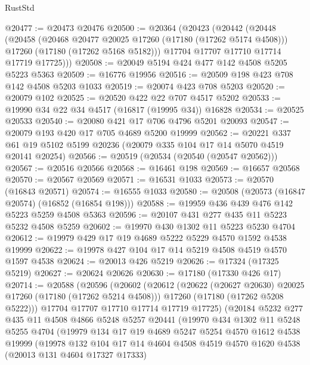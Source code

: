 \begin{lexlean}{RustStd}
\begin{coremodule}
@20477 := @20473 @20476
@20500 := @20364
    (@20423
      (@20442
        (@20448
          (@20458
            (@20468 @20477 @20025 @17260 (@17180 (@17262 @5174 @4508)))
            @17260
            (@17180 (@17262 @5168 @5182)))
          @17704
          @17707
          @17710
          @17714
          @17719
          @17725)))
@20508 := @20049 @5194 @424 @477 @142 @4508 @5205 @5223 @5363
@20509 := @16776 @19956
@20516 := @20509 @198 @423 @708 @142 @4508 @5203 @1033
@20519 := @20074 @423 @708 @5203
@20520 := @20079 @102
@20525 := @20520 @422 @22 @707 @4517 @5202
@20533 := @19990 @34 @22 @34 @4517 (@16817 (@19995 @34)) @16828
@20534 := @20525 @20533
@20540 := @20080 @421 @17 @706 @4796 @5201 @20093
@20547 := @20079 @193 @420 @17 @705 @4689 @5200 @19999
@20562 := @20221
    @337
    @61
    @19
    @5102
    @5199
    @20236
    (@20079 @335 @104 @17 @14 @5070 @4519 @20141 @20254)
@20566 := @20519 (@20534 (@20540 (@20547 @20562)))
@20567 := @20516 @20566
@20568 := @16461 @198
@20569 := @16657 @20568
@20570 := @20567 @20569
@20571 := @16531 @1033
@20573 := @20570 (@16843 @20571)
@20574 := @16555 @1033
@20580 := @20508 (@20573 (@16847 @20574) (@16852 (@16854 @198)))
@20588 := @19959 @436 @439 @476 @142 @5223 @5259 @4508 @5363
@20596 := @20107 @431 @277 @435 @11 @5223 @5232 @4508 @5259
@20602 := @19970 @430 @1302 @11 @5223 @5230 @4704
@20612 := @19979 @429 @17 @19 @4689 @5222 @5229 @4570 @1592 @4538 @19999
@20622 := @19978 @427 @104 @17 @14 @5219 @4508 @4519 @4570 @1597 @4538
@20624 := @20013 @426 @5219
@20626 := @17324 (@17325 @5219)
@20627 := @20624 @20626
@20630 := @17180 (@17330 @426 @17)
@20714 := @20588
    (@20596
      (@20602
        (@20612
          (@20622 (@20627 @20630) @20025 @17260 (@17180 (@17262 @5214 @4508)))
          @17260
          (@17180 (@17262 @5208 @5222)))
        @17704
        @17707
        @17710
        @17714
        @17719
        @17725)
      (@20184
        @5232
        @277
        @435
        @11
        @4508
        @4866
        @5248
        @5257
        @20441
        (@19970
          @434
          @1302
          @11
          @5248
          @5255
          @4704
          (@19979
            @134
            @17
            @19
            @4689
            @5247
            @5254
            @4570
            @1612
            @4538
            @19999
            (@19978
              @132
              @104
              @17
              @14
              @4604
              @4508
              @4519
              @4570
              @1620
              @4538
              (@20013 @131 @4604 @17327 @17333)

\end{coremodule}
\end{lexlean}
